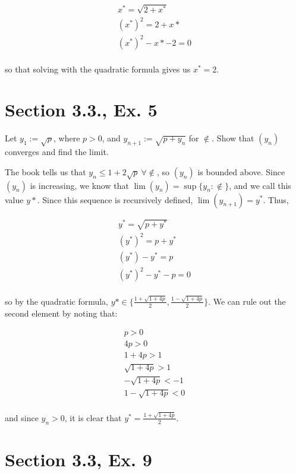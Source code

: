 \documentclass[paper=a4, fontsize=11pt]{scrartcl} %
\numberwithin{equation}{section} %
\numberwithin{figure}{section} %
\numberwithin{table}{section} %
\begin{document}
\begin{gather*}
x^* = \sqrt{2 + x^*}\\
(x^*)^2 = 2 + x*\\
(x^*)^2 - x* - 2 = 0\\
\end{gather*}

so that solving with the quadratic formula gives us $x^* = 2$. \done

\section*{Section 3.3., Ex. 5}

Let $y_1 := \sqrt{p}$, where $p > 0$, and $y_{n+1} := \sqrt{ p + y_n}$ for $\nin$. Show that $(y_n)$ converges and find the limit.

\newcommand{\fanin}{\forall \nin}
\pf The book tells us that $y_n \leq 1 + 2\sqrt{p} ~\fanin$, so $(y_n)$ is bounded above. Since $(y_n)$ is increasing, we know that $\lim(y_n) = \sup\{y_n : \nin\}$, and we call this value $y*$. Since this sequence is recursively defined, $\lim(y_{n+1}) = y^*$. Thus,

\begin{gather*}
y^* = \sqrt{p + y^*}\\
(y^*)^2 = p + y^*\\
(y^*) - y^* = p\\
(y^*)^2 - y^* - p = 0\\
\end{gather*}

so by the quadratic formula, $y* \in \{\frac{1 + \sqrt{1 + 4p}}{2}, \frac{1 - \sqrt{1 + 4p}}{2}\}$. We can rule out the second element by noting that:

\begin{gather*}
p > 0\\
4p > 0\\
1 + 4p > 1\\
\sqrt{1 + 4p} > 1\\
-\sqrt{1 + 4p} < -1\\
1 - \sqrt{1 + 4p} < 0\\
\end{gather*}

and since $y_n > 0$, it is clear that $y^* = \frac{1 + \sqrt{1 + 4p}}{2}$.\done

\section*{Section 3.3, Ex. 9}
\end{document}
